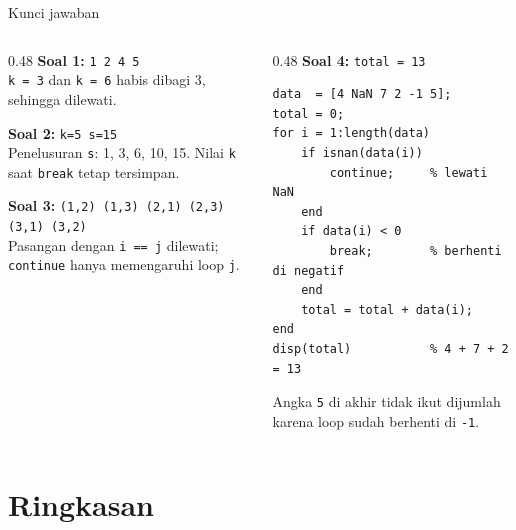 \documentclass[aspectratio=169,10pt]{beamer}
\newcommand{\codesize}{\footnotesize}
\newcommand{\kode}[1]{\texttt{#1}}
\begin{document}
\begin{frame}[fragile]{Kunci jawaban}
  \renewcommand{\codesize}{\scriptsize}
  \begin{columns}[T]
    \begin{column}{0.48\textwidth}
      \textbf{Soal 1:} \kode{1 2 4 5}\\
      \footnotesize \kode{k = 3} dan \kode{k = 6} habis dibagi 3, sehingga dilewati.
      \vspace{6pt}

      \normalsize\textbf{Soal 2:} \kode{k=5 s=15}\\
      \footnotesize Penelusuran \kode{s}: 1, 3, 6, 10, \alert{15}. Nilai \kode{k} saat \kode{break}
      tetap tersimpan.
      \vspace{6pt}

      \normalsize\textbf{Soal 3:} \kode{(1,2) (1,3) (2,1) (2,3) (3,1) (3,2)}\\
      \footnotesize Pasangan dengan \kode{i == j} dilewati; \kode{continue} hanya memengaruhi loop \kode{j}.
    \end{column}
    \begin{column}{0.48\textwidth}
      \textbf{Soal 4:} \kode{total = 13}
\begin{lstlisting}
data  = [4 NaN 7 2 -1 5];
total = 0;
for i = 1:length(data)
    if isnan(data(i))
        continue;     % lewati NaN
    end
    if data(i) < 0
        break;        % berhenti di negatif
    end
    total = total + data(i);
end
disp(total)           % 4 + 7 + 2 = 13
\end{lstlisting}
      \footnotesize Angka \kode{5} di akhir tidak ikut dijumlah karena loop sudah berhenti di \kode{-1}.
    \end{column}
  \end{columns}
\end{frame}

\section{Ringkasan}
\end{document}
